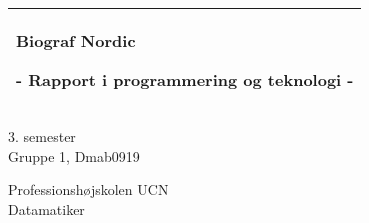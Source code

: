 %
\begin{titlepage}
  \addtolength{\hoffset}{0.5\evensidemargin-0.5\oddsidemargin}%
  \noindent%
  \begin{tabular}{@{}p{\textwidth}@{}}
    \toprule[2pt]
    \midrule
    \vspace{0.2cm}
    \begin{center}
    \Huge{\textbf{
      Biograf Nordic %
    }}
    \end{center}
    \begin{center}
      \Large{
        - Rapport i programmering og teknologi - %
      }
    \end{center}
    \vspace{0.2cm}\\
    \midrule
    \toprule[2pt]
  \end{tabular}
  \vspace{4 cm}
  \begin{center}
    {\large
      3. semester %
    }\\
    \vspace{0.2cm}
    {\Large
      Gruppe 1, Dmab0919 %
    }
  \end{center}
  \vfill
  \begin{center}
  Professionshøjskolen UCN\\
  Datamatiker
  \end{center}
\end{titlepage}
\clearpage